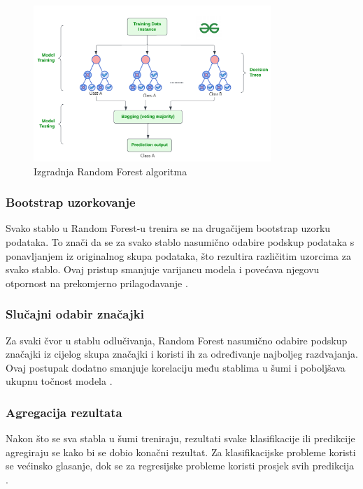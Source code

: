 \documentclass[zavrsnirad]{fer}
\begin{document}
\begin{figure}[h]
	\centering
	\includegraphics[width=0.8\textwidth]{Figures/random_forests.png}
	\caption{Izgradnja Random Forest algoritma \cite{geeksforgeeks2021}}
	\label{fig:random_forest}
\end{figure}

\subsubsection{Bootstrap uzorkovanje}
Svako stablo u Random Forest-u trenira se na drugačijem bootstrap uzorku podataka. To znači da se za svako stablo nasumično odabire podskup podataka s ponavljanjem iz originalnog skupa podataka, što rezultira različitim uzorcima za svako stablo. Ovaj pristup smanjuje varijancu modela i povećava njegovu otpornost na prekomjerno prilagođavanje \cite{segal2004machine}.

\subsubsection{Slučajni odabir značajki}
Za svaki čvor u stablu odlučivanja, Random Forest nasumično odabire podskup značajki iz cijelog skupa značajki i koristi ih za određivanje najboljeg razdvajanja. Ovaj postupak dodatno smanjuje korelaciju među stablima u šumi i poboljšava ukupnu točnost modela \cite{segal2004machine}.

\subsubsection{Agregacija rezultata}
Nakon što se sva stabla u šumi treniraju, rezultati svake klasifikacije ili predikcije agregiraju se kako bi se dobio konačni rezultat. Za klasifikacijske probleme koristi se većinsko glasanje, dok se za regresijske probleme koristi prosjek svih predikcija \cite{sarica2017}.
\end{document}
